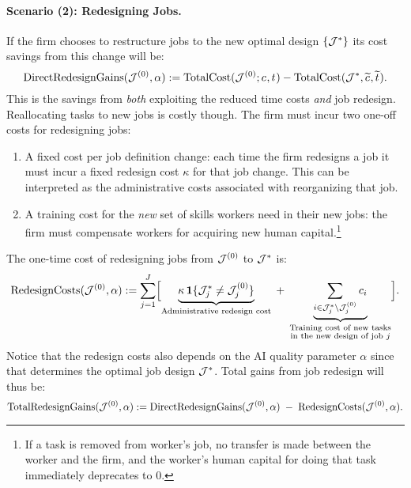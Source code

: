 \documentclass{article}
\theoremstyle{plain}
\theoremstyle{plain}
\begin{document}
\paragraph{Scenario (2): Redesigning Jobs.}
If the firm chooses to restructure jobs to the new optimal design \(\{\mathcal{J}^*\}\) its cost savings from this change will be:
\begin{equation}
\label{eq:job_redesign_direct_savings}
\text{DirectRedesignGains}(\mathcal{J}^{(0)}, \alpha)
:=
\text{TotalCost}(\mathcal{J}^{(0)}; c_{}, t_{}) - \text{TotalCost}(\mathcal{J}^{*}, \widetilde{c_{}}, \widetilde{t_{}}).
\end{equation}
This is the savings from \emph{both} exploiting the reduced time costs \emph{and} job redesign.
Reallocating tasks to new jobs is costly though.
The firm must incur two one-off costs for redesigning jobs:
\begin{enumerate}
\item A fixed cost per job definition change: each time the firm redesigns a job it must incur a fixed redesign cost $\kappa$ for that job change.
This can be interpreted as the administrative costs associated with reorganizing that job.
\item A training cost for the \emph{new} set of skills workers need in their new jobs: the firm must compensate workers for acquiring new human capital.\footnote{If a task is removed from worker's job, no transfer is made between the worker and the firm, and the worker's human capital for doing that task immediately deprecates to 0.}
\end{enumerate}
The one-time cost of redesigning jobs from $\mathcal{J}^{(0)}$ to $\mathcal{J}^{*}$ is:
\begin{equation}
\label{eq:job_redesign_cost}
\text{RedesignCosts}(\mathcal{J}^{(0)}, \alpha)
:=
\sum_{j=1}^{J}
\Bigl[
\underbrace{\kappa\,\mathbf1\{\mathcal{J}_j^*\neq\mathcal{J}_j^{(0)}\}}_{\text{Administrative redesign cost}}
\;+\;
\underbrace{\sum_{i\in\mathcal{J}_j^*\setminus\mathcal{J}_j^{(0)}}c_{i}}_{\substack{
\text{Training cost of new tasks}\\ 
\text{in the new design of job $j$}}
}
\Bigr].
\end{equation}
Notice that the redesign costs also depends on the AI quality parameter $\alpha$ since that determines the optimal job design $\mathcal{J}^{*}$.
Total gains from job redesign will thus be:
\begin{equation}
\label{eq:job_redesign_gain}
\text{TotalRedesignGains}(\mathcal{J}^{(0)}, \alpha)
:=
\text{DirectRedesignGains}(\mathcal{J}^{(0)}, \alpha)
\;-\;
\text{RedesignCosts}(\mathcal{J}^{(0)}, \alpha).
\end{equation}
\end{document}

